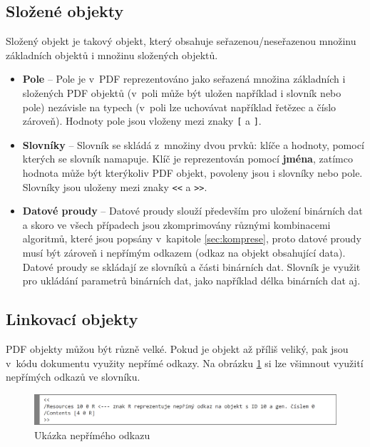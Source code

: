 \subsection{Složené objekty}	
Složený objekt je takový objekt, který obsahuje seřazenou/neseřazenou množinu základních objektů i množinu složených objektů.
	\begin{itemize}
		\item \textbf{Pole} -- Pole je v~PDF reprezentováno jako seřazená množina základních i složených PDF objektů (v~poli může být uložen například i slovník nebo pole) nezávisle na typech (v~poli lze uchovávat například řetězec a číslo zároveň). Hodnoty pole jsou vloženy mezi znaky \verb|[| a \verb|]|.
		\item \textbf{Slovníky} -- Slovník se skládá z~množiny dvou prvků: klíče a hodnoty, pomocí kterých se slovník namapuje. Klíč je reprezentován pomocí \textbf{jména}, zatímco hodnota může být kterýkoliv PDF objekt, povoleny jsou i slovníky nebo pole. Slovníky jsou uloženy mezi znaky \verb|<<| a \verb|>>|.
		\item \textbf{Datové proudy} -- Datové proudy slouží především pro uložení binárních dat a skoro ve všech případech jsou zkomprimovány různými kombinacemi algoritmů, které jsou popsány v~kapitole \ref{sec:komprese}, proto datové proudy musí být zároveň i nepřímým odkazem (odkaz na objekt obsahující data). Datové proudy se skládají ze slovníků a části binárních dat. Slovník je využit pro ukládání parametrů binárních dat, jako například délka binárních dat aj.
	\end{itemize}
\subsection{Linkovací objekty}
PDF objekty můžou být různě velké. Pokud je objekt až příliš veliký, pak jsou v~kódu dokumentu využity nepřímé odkazy. Na obrázku \ref{fig:indirect_reference} si lze všimnout využití nepřímých odkazů ve slovníku. 
	\begin{figure}[h!]
	\centering
	\includegraphics[width=15cm]{img/pdf_indirect_reference}
	\caption{Ukázka nepřímého odkazu}
	\label{fig:indirect_reference}
	\end{figure}

